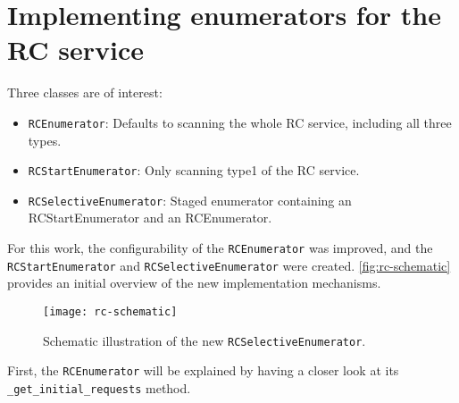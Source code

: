 \section{Implementing enumerators for the RC service}

Three classes are of interest:

\begin{itemize}
    \item \texttt{RCEnumerator}: Defaults to scanning the whole RC service, including all three types.
    \item \texttt{RCStartEnumerator}: Only scanning type1 of the RC service.
    \item \texttt{RCSelectiveEnumerator}: Staged enumerator containing an RCStartEnumerator and an RCEnumerator.
\end{itemize}

For this work, the configurability of the \texttt{RCEnumerator} was improved, and the \texttt{RCStartEnumerator} and \texttt{RCSelectiveEnumerator} were created. \autoref{fig:rc-schematic} provides an initial overview of the new implementation mechanisms.

\begin{figure}[htb]
    \centering
    \texttt{[image: rc-schematic]}
    \caption{Schematic illustration of the new \texttt{RCSelectiveEnumerator}.}
    \label{fig:rc-schematic}
\end{figure}

First, the \texttt{RCEnumerator} will be explained by having a closer look at its \texttt{_get_initial_requests} method.


